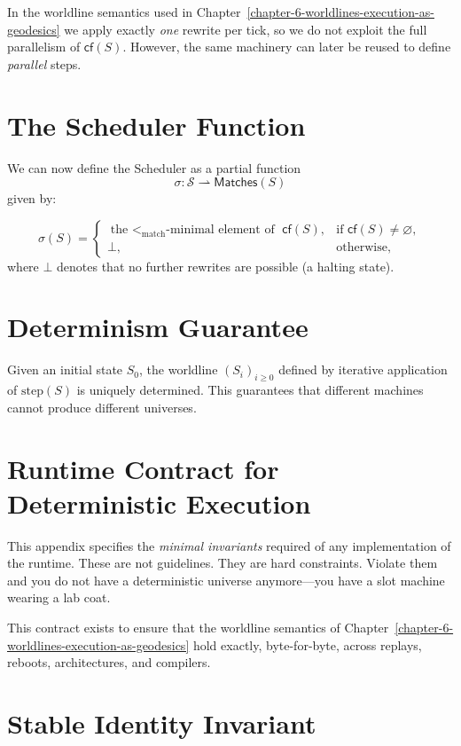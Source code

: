 \medskip

In the worldline semantics used in Chapter~\ref{chapter-6-worldlines-execution-as-geodesics}
we apply exactly \emph{one} rewrite per tick, so we do not exploit the full parallelism of
$\mathsf{cf}(S)$. However, the same machinery can later be reused to define
\emph{parallel} steps.

\section{The Scheduler Function}

We can now define the Scheduler as a partial function
\[
\sigma : \mathcal{S} \rightharpoonup \mathsf{Matches}(S)
\]
given by:

\[
\sigma(S) =
\begin{cases}
\text{the $<_{\text{match}}$-minimal element of } \mathsf{cf}(S), & \text{if } \mathsf{cf}(S) \neq \varnothing, \\
\bot, & \text{otherwise,}
\end{cases}
\]
where $\bot$ denotes that no further rewrites are possible (a halting state).

\section{Determinism Guarantee}

Given an initial state $S_0$, the worldline $(S_i)_{i \ge 0}$ defined by iterative application of
$\mathrm{step}(S)$ is uniquely determined. This guarantees that different machines cannot produce
different universes.

\section{Runtime Contract for Deterministic Execution}
\label{appendix:runtime-contract}

This appendix specifies the \emph{minimal invariants} required of any
implementation of the \COMPUTER{} runtime. These are not guidelines.
They are hard constraints. Violate them and you do not have a deterministic
universe anymore—you have a slot machine wearing a lab coat.

This contract exists to ensure that the worldline semantics of
Chapter~\ref{chapter-6-worldlines-execution-as-geodesics} hold exactly,
byte-for-byte, across replays, reboots, architectures, and compilers.

\section{Stable Identity Invariant}


